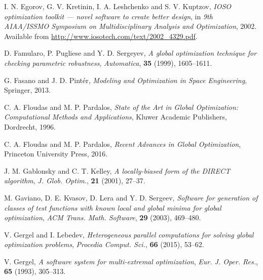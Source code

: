 \documentclass[runningheads]{llncs}
\begin{document}
\begin{thebibliography}{107}
\newblock I. N. Egorov, G. V. Kretinin, I. A. Leshchenko and S. V. Kuptzov,
\newblock \emph{\emph{IOSO optimization toolkit --- novel software to create better design}},
\newblock in \emph{9th AIAA/ISSMO Symposium on Multidisciplinary Analysis and Optimization}, 2002. Available from \url{http://www.iosotech.com/text/2002\_4329.pdf}.

\newblock D. Famularo, P. Pugliese and Y. D. Sergeyev,
\newblock \emph{\emph{A global optimization technique for checking parametric robustness}},
\newblock \emph{Automatica}, \textbf{35} (1999), 1605--1611.

\newblock G. Fasano and J. D. Pint\'er,
\newblock \emph{Modeling and Optimization in Space Engineering},
\newblock Springer, 2013.

\newblock C. A. Floudas and M. P. Pardalos,
\newblock \emph{State of the Art in Global Optimization: Computational Methods and Applications},
\newblock Kluwer Academic Publishers, Dordrecht, 1996.

\newblock C. A. Floudas and M. P. Pardalos,
\newblock \emph{Recent Advances in Global Optimization},
\newblock Princeton University Press, 2016.

\newblock J. M. Gablonsky and C. T. Kelley,
\newblock \emph{\emph{A locally-biased form of the DIRECT algorithm}},
\newblock \emph{J. Glob. Optim.}, \textbf{21} (2001), 27--37.

\newblock M. Gaviano, D. E. Kvasov, D. Lera and Y. D. Sergeev,
\newblock \emph{\emph{Software for generation of classes of test functions with known local and global minima for global optimization}},
\newblock \emph{ACM Trans. Math. Software}, \textbf{29} (2003), 469--480.

\newblock V. Gergel and I. Lebedev,
\newblock \emph{\emph{Heterogeneous parallel computations for solving global optimization problems}},
\newblock \emph{Procedia Comput. Sci.}, \textbf{66} (2015), 53--62.

\newblock V. Gergel,
\newblock \emph{\emph{A software system for multi-extremal optimization}},
\newblock \emph{Eur. J. Oper. Res.}, \textbf{65} (1993), 305--313.


\end{thebibliography}
\end{document}
